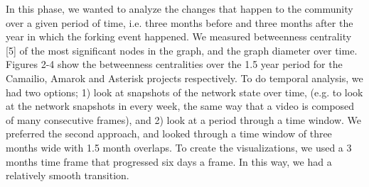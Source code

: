 \documentclass[ifip]{svmult}
\begin{document}
In this phase, we wanted to analyze the changes that happen to the community over a given period of time, i.e. three months before and three months after the year in which the forking event happened. We measured betweenness centrality [5] of the most significant nodes in the graph, and the graph diameter over time. Figures 2-4 show the betweenness centralities over the 1.5 year period for the Camailio, Amarok and Asterisk projects respectively. To do temporal analysis, we had two options; 1) look at snapshots of the network state over time, (e.g. to look at the network snapshots in every week, the same way that a video is composed of many consecutive frames), and 2) look at a period through a time window. We preferred the second approach, and looked through a time window of three months wide with 1.5 month overlaps. To create the visualizations, we used a 3 months time frame that progressed six days a frame. In this way, we had a relatively smooth transition.
\end{document}
